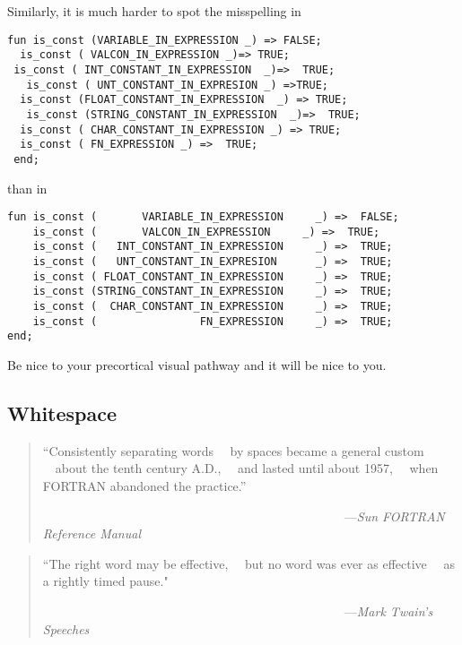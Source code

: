 Similarly, it is much harder to spot the misspelling in
\begin{verbatim}
fun is_const (VARIABLE_IN_EXPRESSION _) => FALSE;
  is_const ( VALCON_IN_EXPRESSION _)=> TRUE;
 is_const ( INT_CONSTANT_IN_EXPRESSION  _)=>  TRUE;
   is_const ( UNT_CONSTANT_IN_EXPRESION _) =>TRUE;
  is_const (FLOAT_CONSTANT_IN_EXPRESSION  _) => TRUE;
   is_const (STRING_CONSTANT_IN_EXPRESSION  _)=>  TRUE;
  is_const ( CHAR_CONSTANT_IN_EXPRESSION _) => TRUE;
  is_const ( FN_EXPRESSION _) =>  TRUE;
 end;
\end{verbatim}
than in
\begin{verbatim}
fun is_const (       VARIABLE_IN_EXPRESSION     _) =>  FALSE;
    is_const (       VALCON_IN_EXPRESSION     _) =>  TRUE;
    is_const (   INT_CONSTANT_IN_EXPRESSION     _) =>  TRUE;
    is_const (   UNT_CONSTANT_IN_EXPRESION      _) =>  TRUE;
    is_const ( FLOAT_CONSTANT_IN_EXPRESSION     _) =>  TRUE;
    is_const (STRING_CONSTANT_IN_EXPRESSION     _) =>  TRUE;
    is_const (  CHAR_CONSTANT_IN_EXPRESSION     _) =>  TRUE;
    is_const (                FN_EXPRESSION     _) =>  TRUE;
end;
\end{verbatim}

Be nice to your precortical visual pathway and it will be nice to you.

\subsection{Whitespace}

\begin{quote}\begin{tiny}
       ``Consistently separating words\newline
       ~~by spaces became a general custom\newline
       ~~about the tenth century A.D.,\newline
       ~~and lasted until about 1957,\newline
       ~~when FORTRAN abandoned the practice.''\newline

               ~~~~~~~~~~~~~~~~~~~~~~~~~~~~~~~~~~~~~~~~~~~~~~~~---{\em Sun FORTRAN Reference Manual}
\end{tiny}\end{quote}

\begin{quote}\begin{tiny}
       ``The right word may be effective,\newline
       ~~but no word was ever as effective\newline
       ~~as a rightly timed pause."\newline

               ~~~~~~~~~~~~~~~~~~~~~~~~~~~~~~~~~~~~~~~~~~~~~~~~---{\em Mark Twain's Speeches}
\end{tiny}\end{quote}


